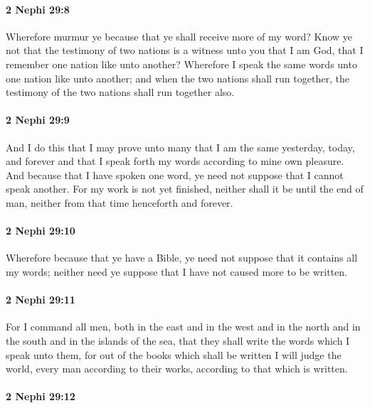 		\paragraph{2 Nephi 29:8} %
			\label{2NEPHI-29-8}

			Wherefore murmur ye because that ye shall receive more of my word?
			Know ye not that the testimony of two nations
			is a witness unto you that I am God,
			that I remember one nation like unto another?
			Wherefore I speak the same words unto one nation like unto another;
			and when the two nations shall run together,
			the testimony of the two nations shall run together also.

		\paragraph{2 Nephi 29:9} %
			\label{2NEPHI-29-9}

			And I do this that I may prove unto many
			that I am the same yesterday, today, and forever
			and that I speak forth my words according to mine own pleasure.
			And because that I have spoken one word,
			ye need not suppose that I cannot speak another.
			For my work is not yet finished,
			neither shall it be until the end of man,
			neither from that time henceforth and forever.

		\paragraph{2 Nephi 29:10} %
			\label{2NEPHI-29-10}

			Wherefore because that ye have a Bible,
			ye need not suppose that it contains all my words;
			neither need ye suppose that I have not caused more to be written.

		\paragraph{2 Nephi 29:11} %
			\label{2NEPHI-29-11}

			For I command all men,
			both in the east and in the west and in the north and in the south
			and in the islands of the sea,
			that they shall write the words which I speak unto them,
			for out of the books which shall be written I will judge the world,
			every man according to their works,
			according to that which is written.

		\paragraph{2 Nephi 29:12} %
			\label{2NEPHI-29-12}

